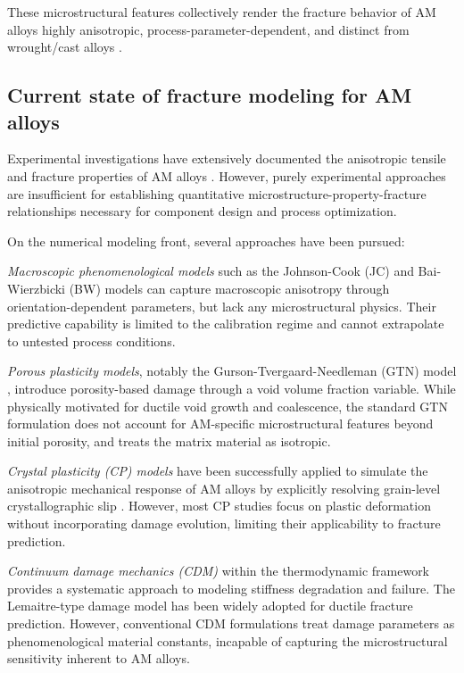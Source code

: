 \documentclass[twocolumn]{sagej}
\begin{document}
These microstructural features collectively render the fracture behavior of AM alloys highly anisotropic, process-parameter-dependent, and distinct from wrought/cast alloys \cite{carroll2015anisotropic,kok2018anisotropy}.

\subsection{Current state of fracture modeling for AM alloys}

Experimental investigations have extensively documented the anisotropic tensile and fracture properties of AM alloys \cite{simonelli2014formation,leuders2013mechanical,wen2019damage}. However, purely experimental approaches are insufficient for establishing quantitative microstructure-property-fracture relationships necessary for component design and process optimization.

On the numerical modeling front, several approaches have been pursued:

\textit{Macroscopic phenomenological models} such as the Johnson-Cook (JC) \cite{johnson1985fracture} and Bai-Wierzbicki (BW) \cite{bai2008new} models can capture macroscopic anisotropy through orientation-dependent parameters, but lack any microstructural physics. Their predictive capability is limited to the calibration regime and cannot extrapolate to untested process conditions.

\textit{Porous plasticity models}, notably the Gurson-Tvergaard-Needleman (GTN) model \cite{gurson1977continuum,tvergaard1984analysis}, introduce porosity-based damage through a void volume fraction variable. While physically motivated for ductile void growth and coalescence, the standard GTN formulation does not account for AM-specific microstructural features beyond initial porosity, and treats the matrix material as isotropic.

\textit{Crystal plasticity (CP) models} have been successfully applied to simulate the anisotropic mechanical response of AM alloys by explicitly resolving grain-level crystallographic slip \cite{zhang2018crystal,liu2020crystal,kapoor2021modeling}. However, most CP studies focus on plastic deformation without incorporating damage evolution, limiting their applicability to fracture prediction.

\textit{Continuum damage mechanics (CDM)} within the thermodynamic framework \cite{lemaitre1992course,chaboche1988continuum} provides a systematic approach to modeling stiffness degradation and failure. The Lemaitre-type damage model \cite{lemaitre1985continuous} has been widely adopted for ductile fracture prediction. However, conventional CDM formulations treat damage parameters as phenomenological material constants, incapable of capturing the microstructural sensitivity inherent to AM alloys.
\end{document}
